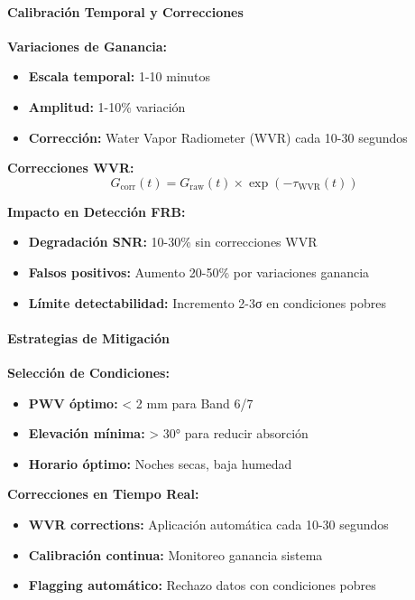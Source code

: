 \paragraph{Calibración Temporal y Correcciones}

\textbf{Variaciones de Ganancia:}
\begin{itemize}
\item \textbf{Escala temporal:} 1-10 minutos
\item \textbf{Amplitud:} 1-10\% variación
\item \textbf{Corrección:} Water Vapor Radiometer (WVR) cada 10-30 segundos
\end{itemize}

\textbf{Correcciones WVR:}
\[
G_{\text{corr}}(t) = G_{\text{raw}}(t) \times \exp(-\tau_{\text{WVR}}(t))
\]

\textbf{Impacto en Detección FRB:}
\begin{itemize}
\item \textbf{Degradación SNR:} 10-30\% sin correcciones WVR
\item \textbf{Falsos positivos:} Aumento 20-50\% por variaciones ganancia
\item \textbf{Límite detectabilidad:} Incremento 2-3σ en condiciones pobres
\end{itemize}

\paragraph{Estrategias de Mitigación}

\textbf{Selección de Condiciones:}
\begin{itemize}
\item \textbf{PWV óptimo:} < 2 mm para Band 6/7
\item \textbf{Elevación mínima:} > 30° para reducir absorción
\item \textbf{Horario óptimo:} Noches secas, baja humedad
\end{itemize}

\textbf{Correcciones en Tiempo Real:}
\begin{itemize}
\item \textbf{WVR corrections:} Aplicación automática cada 10-30 segundos
\item \textbf{Calibración continua:} Monitoreo ganancia sistema
\item \textbf{Flagging automático:} Rechazo datos con condiciones pobres
\end{itemize}

